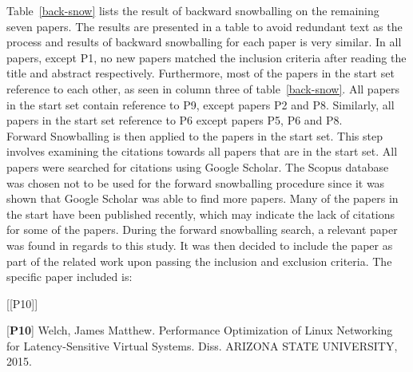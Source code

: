 Table~\ref{back-snow} lists the result of backward snowballing on the remaining seven papers. The results are presented in a table to avoid redundant text as the process and results of backward snowballing for each paper is very similar. In all papers, except P1, no new papers matched the inclusion criteria after reading the title and abstract respectively. Furthermore, most of the papers in the start set reference to each other, as seen in column three of table~\ref{back-snow}. All papers in the start set contain reference to P9, except papers P2 and P8. Similarly, all papers in the start set reference to P6 except papers P5, P6 and P8.\\

Forward Snowballing is then applied to the papers in the start set. This step involves examining the citations towards all papers that are in the start set. All papers were searched for citations using Google Scholar. The Scopus database was chosen not to be used for the forward snowballing procedure since it was shown that Google Scholar was able to find more papers. Many of the papers in the start have been published recently, which may indicate the lack of citations for some of the papers. During the forward snowballing search, a relevant paper was found in regards to this study. It was then decided to include the paper as part of the related work upon passing the inclusion and exclusion criteria. The specific paper included is: \\

\begin{labeling}{[{[}P10{]}]}
\item [{[}\textbf{P10}{]}]  Welch, James Matthew. Performance Optimization of Linux Networking for Latency-Sensitive Virtual Systems. Diss. ARIZONA STATE UNIVERSITY, 2015.

\item
\end{labeling}

